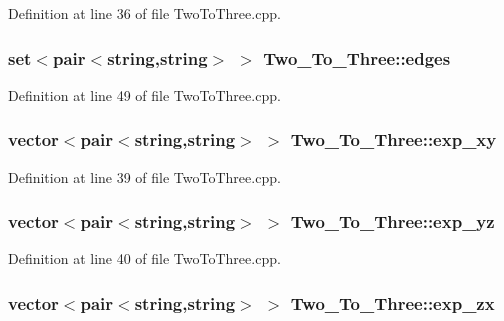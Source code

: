 Definition at line 36 of file Two\+To\+Three.\+cpp.

\subsubsection[{\texorpdfstring{edges}{edges}}]{\setlength{\rightskip}{0pt plus 5cm}set$<$pair$<$string,string$>$ $>$ Two\+\_\+\+To\+\_\+\+Three\+::edges}\hypertarget{class_two___to___three_a1dea63027222bee8934b66010b0e44a3}{}\label{class_two___to___three_a1dea63027222bee8934b66010b0e44a3}


Definition at line 49 of file Two\+To\+Three.\+cpp.

\subsubsection[{\texorpdfstring{exp\+\_\+xy}{exp_xy}}]{\setlength{\rightskip}{0pt plus 5cm}vector$<$pair$<$string,string$>$ $>$ Two\+\_\+\+To\+\_\+\+Three\+::exp\+\_\+xy}\hypertarget{class_two___to___three_a0fb51cd40a43e0371a930ecc7ae5cca7}{}\label{class_two___to___three_a0fb51cd40a43e0371a930ecc7ae5cca7}


Definition at line 39 of file Two\+To\+Three.\+cpp.

\subsubsection[{\texorpdfstring{exp\+\_\+yz}{exp_yz}}]{\setlength{\rightskip}{0pt plus 5cm}vector$<$pair$<$string,string$>$ $>$ Two\+\_\+\+To\+\_\+\+Three\+::exp\+\_\+yz}\hypertarget{class_two___to___three_a2fd53fedb88911745fdfe403fe954194}{}\label{class_two___to___three_a2fd53fedb88911745fdfe403fe954194}


Definition at line 40 of file Two\+To\+Three.\+cpp.

\subsubsection[{\texorpdfstring{exp\+\_\+zx}{exp_zx}}]{\setlength{\rightskip}{0pt plus 5cm}vector$<$pair$<$string,string$>$ $>$ Two\+\_\+\+To\+\_\+\+Three\+::exp\+\_\+zx}\hypertarget{class_two___to___three_a0fc9541c8e1dc603ace96c135851ad26}{}\label{class_two___to___three_a0fc9541c8e1dc603ace96c135851ad26}


